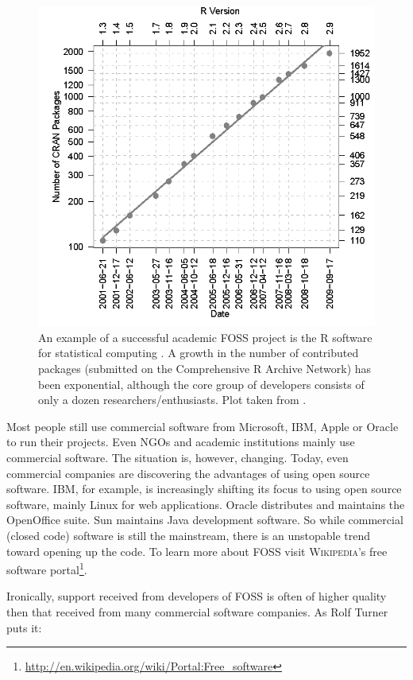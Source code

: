 \documentclass[graybox,envcountchap,sectrefs,UStrade]{svmono}
\begin{document}
\begin{figure}[!htb]
\begin{center}
  \includegraphics[width=.7\textwidth]{Fig_plot_RJournal_2009_2_Fox.png}
\caption{An example of a successful academic FOSS project is the \textsf{R} software for statistical computing \citep{chambers2008software,Kabacoff2011}. A growth in the number of contributed packages (submitted on the Comprehensive \textsf{R} Archive Network) has been exponential, although the core group of developers consists of only a dozen researchers/enthusiasts. Plot taken from \citet[Fig.3]{Fox2009RJournal}.} \label{Fig_plot_RJournal_2009_2_Fox}
\end{center}
\end{figure}

Most people still use commercial software from Microsoft, IBM, Apple or Oracle to run their projects. Even NGOs and academic institutions mainly use commercial software. The situation is, however, changing. Today, even commercial companies are discovering the advantages of using open source software. IBM, for example, is increasingly shifting its focus to using open source software, mainly Linux for web applications. Oracle distributes and maintains the \textsf{OpenOffice} suite. Sun maintains Java development software. So while commercial (closed code) software is still the mainstream, there is an unstopable trend toward opening up the code. To learn more about FOSS visit \textsc{Wikipedia}'s free software portal\footnote{\url{http://en.wikipedia.org/wiki/Portal:Free_software}}.\par

Ironically, support received from developers of FOSS is often of higher quality then that received from many commercial software companies. As Rolf Turner puts it:
\end{document}
